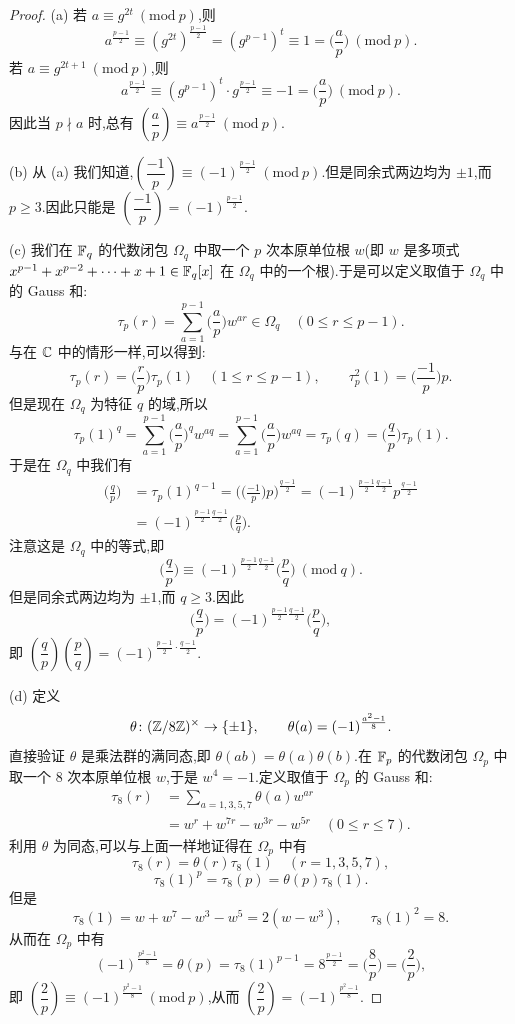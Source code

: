 \begin{proof}
(a) 若 $a\equiv g^{2t}\ (\mathrm{mod}\ p)$,则
\[
  a^{\frac{p-1}{2}}\equiv(g^{2t})^{\frac{p-1}{2}}=(g^{p-1})^t\equiv 1=\Big(\frac{a}{p}\Big)\ (\mathrm{mod}\ p).
\]
若 $a\equiv g^{2t+1}\ (\mathrm{mod}\ p)$,则
\[
  a^{\frac{p-1}{2}}\equiv(g^{p-1})^t\cdot g^{\frac{p-1}{2}}\equiv -1=\Big(\frac{a}{p}\Big)\ (\mathrm{mod}\ p).
\]
因此当 $p\nmid a$ 时,总有 $\left(\dfrac{a}{p}\right)\equiv a^{\frac{p-1}{2}}\ (\mathrm{mod}\ p)$.

(b) 从 (a) 我们知道,$\left(\dfrac{-1}{p}\right)\equiv(-1)^{\frac{p-1}{2}}\ (\mathrm{mod}\ p)$.但是同余式两边均为 $\pm 1$,而 $p\geqslant 3$.因此只能是 $\left(\dfrac{-1}{p}\right)=(-1)^{\frac{p-1}{2}}$.

(c) 我们在 $\mathbb{F}_q$ 的代数闭包 $\Omega_q$ 中取一个 $p$ 次本原单位根 $w$(即 $w$ 是多项式 $x^{p-1}+x^{p-2}+\cdots+x+1\in\mathbb{F}_q[x]$ 在 $\Omega_q$ 中的一个根).于是可以定义取值于 $\Omega_q$ 中的 Gauss 和:
\[
  \tau_p(r)=\sum_{a=1}^{p-1}\Big(\frac{a}{p}\Big)w^{ar}\in\Omega_q\quad (0\leqslant r\leqslant p-1).
\]
与在 $\mathbb{C}$ 中的情形一样,可以得到:
\[
  \tau_p(r)=\Big(\frac{r}{p}\Big)\tau_p(1)\quad (1\leqslant r\leqslant p-1),\qquad
  \tau_p^2(1)=\Big(\frac{-1}{p}\Big)p.
\]
但是现在 $\Omega_q$ 为特征 $q$ 的域,所以
\[
  \tau_p(1)^q=\sum_{a=1}^{p-1}\Big(\frac{a}{p}\Big)^qw^{aq}
  =\sum_{a=1}^{p-1}\Big(\frac{a}{p}\Big)w^{aq}
  =\tau_p(q)=\Big(\frac{q}{p}\Big)\tau_p(1).
\]
于是在 $\Omega_q$ 中我们有
\begin{align*}
  \Big(\frac{q}{p}\Big)&=\tau_p(1)^{q-1}
  =\Big(\Big(\frac{-1}{p}\Big)p\Big)^{\frac{q-1}{2}}
  =(-1)^{\frac{p-1}{2}\frac{q-1}{2}}p^{\frac{q-1}{2}}\\
  &=(-1)^{\frac{p-1}{2}\frac{q-1}{2}}\Big(\frac{p}{q}\Big).
\end{align*}
注意这是 $\Omega_q$ 中的等式,即
\[
  \Big(\frac{q}{p}\Big)\equiv(-1)^{\frac{p-1}{2}\frac{q-1}{2}}\Big(\frac{p}{q}\Big)\ (\mathrm{mod}\ q).
\]
但是同余式两边均为 $\pm 1$,而 $q\geqslant 3$.因此
\[
  \Big(\frac{q}{p}\Big)=(-1)^{\frac{p-1}{2}\frac{q-1}{2}}\Big(\frac{p}{q}\Big),
\]
即 $\left(\dfrac{q}{p}\right)\left(\dfrac{p}{q}\right)=(-1)^{\frac{p-1}{2}\cdot\frac{q-1}{2}}$.

(d) 定义
\[
  \theta\colon(\mathbb{Z}/8\mathbb{Z})^\times\to\{\pm 1\},\qquad \theta(a)=(-1)^{\frac{a^2-1}{8}}.
\]
直接验证 $\theta$ 是乘法群的满同态,即 $\theta(ab)=\theta(a)\theta(b)$.在 $\mathbb{F}_p$ 的代数闭包 $\Omega_p$ 中取一个 $8$ 次本原单位根 $w$,于是 $w^4=-1$.定义取值于 $\Omega_p$ 的 Gauss 和:
\begin{align*}
  \tau_8(r)&=\sum_{a=1,3,5,7}\theta(a)w^{ar}\\
  &=w^r+w^{7r}-w^{3r}-w^{5r}\quad (0\leqslant r\leqslant 7).
\end{align*}
利用 $\theta$ 为同态,可以与上面一样地证得在 $\Omega_p$ 中有
\[
  \tau_8(r)=\theta(r)\tau_8(1)\quad (r=1,3,5,7),
\]
\[
  \tau_8(1)^p=\tau_8(p)=\theta(p)\tau_8(1).
\]
但是
\[
  \tau_8(1)=w+w^7-w^3-w^5=2(w-w^3),\qquad \tau_8(1)^2=8.
\]
从而在 $\Omega_p$ 中有
\[
  (-1)^{\frac{p^2-1}{8}}=\theta(p)=\tau_8(1)^{p-1}=8^{\frac{p-1}{2}}
  =\Big(\frac{8}{p}\Big)=\Big(\frac{2}{p}\Big),
\]
即 $\left(\dfrac{2}{p}\right)\equiv(-1)^{\frac{p^2-1}{8}}\ (\mathrm{mod}\ p)$,从而 $\left(\dfrac{2}{p}\right)=(-1)^{\frac{p^2-1}{8}}$.
\end{proof}


